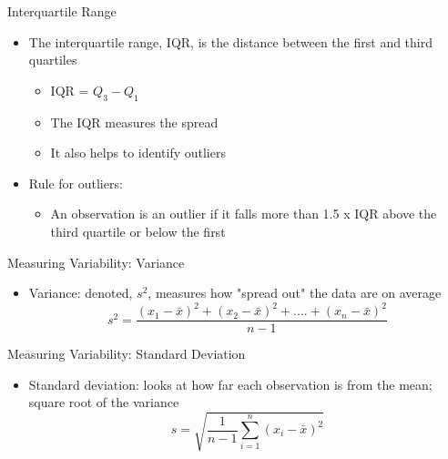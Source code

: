 \documentclass{beamer}
\begin{document}
\begin{frame}{Interquartile Range}
	
	\begin{itemize}
		\item The \alert{interquartile range}, IQR, is the distance between the first and third quartiles
		      \begin{itemize}
		      	\item IQR = $Q_3 - Q_1$
		      	\item The IQR measures the spread
		      	\item It also helps to identify outliers
		      \end{itemize}
		\item Rule for outliers:
		      \begin{itemize}
		      	\item An observation is an outlier if it falls more than 1.5 x IQR above the third quartile or below the first
		      \end{itemize}
	\end{itemize}
	
\end{frame}




\begin{frame}{Measuring Variability: Variance}
	
	\begin{itemize}
		\item \alert{Variance}: denoted, $s^2$, measures how "spread out" the data are on average
		      $$s^2 = \frac{(x_1-\bar{x})^2 + (x_2-\bar{x})^2 + .... + (x_n - \bar{x})^2}{n-1}$$
	\end{itemize}
	
\end{frame}

\begin{frame}{Measuring Variability: Standard Deviation}
	
	\begin{itemize}
		\item \alert{Standard deviation}: looks at how far each observation is from the mean; square root of the variance
		      $$s=\sqrt{\frac{1}{n-1}\sum_{i=1}^n(x_i-\bar{x})^2}$$
	\end{itemize}
	
\end{frame}
\end{document}
